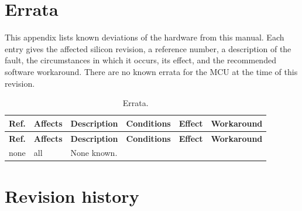\documentclass[11pt,pdftex,openany,letterpaper]{report}
\begin{document}


\clearpage



\chapter{Errata} \label{s:errata}
This appendix lists known deviations of the hardware from this manual. Each entry gives the affected silicon revision, a reference number, a description of the fault, the circumstances in which it occurs, its effect, and the recommended software workaround. There are no known errata for the \AsicNameForUserGuide{} MCU at the time of this revision.

\begin{longtable}[c]{ l l p{3.2cm} p{2.6cm} p{2.6cm} p{2.8cm} }
\caption{Errata.} \label{t:errata} \\
\hline \textbf{Ref.} & \textbf{Affects} & \textbf{Description} & \textbf{Conditions} & \textbf{Effect} & \textbf{Workaround} \\ \hline \endfirsthead
\hline \textbf{Ref.} & \textbf{Affects} & \textbf{Description} & \textbf{Conditions} & \textbf{Effect} & \textbf{Workaround} \\ \hline \endhead
none & all & None known. & & & \\
\hline
\end{longtable}

\clearpage



\chapter{Revision history} \label{s:revhistory}
\end{document}
